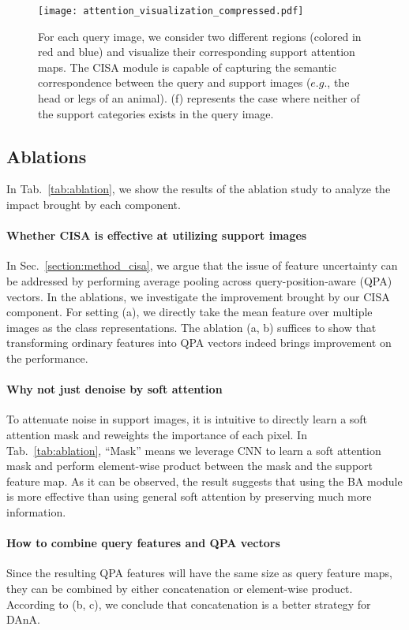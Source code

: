 \documentclass[journal]{IEEEtran}
\begin{document}
\begin{figure*}[h]
    \centering
    \texttt{[image: attention\_visualization\_compressed.pdf]}
    \caption{For each query image, we consider two different regions (colored in red and blue) and visualize their corresponding support attention maps. The CISA module is capable of capturing the semantic correspondence between the query and support images ($e.g.$, the head or legs of an animal). (f) represents the case where neither of the support categories exists in the query image.
    }
    \label{fig:attention_visualization}
\end{figure*} 


\subsection{Ablations}
In Tab.~\ref{tab:ablation}, we show the results of the ablation study to analyze the impact brought by each component.


\paragraph{Whether CISA is effective at utilizing support images}
In Sec.~\ref{section:method_cisa}, we argue that the issue of feature uncertainty can be addressed by performing average pooling across query-position-aware (QPA) vectors.
In the ablations, we investigate the improvement brought by our CISA component.
For setting (a), we directly take the mean feature over multiple images as the class representations.
The ablation (a, b) suffices to show that transforming ordinary features into QPA vectors indeed brings improvement on the performance.


\paragraph{Why not just denoise by soft attention}
To attenuate noise in support images, it is intuitive to directly learn a soft attention mask and reweights the importance of each pixel.
In Tab.~\ref{tab:ablation}, ``Mask'' means we leverage CNN to learn a soft attention mask and perform element-wise product between the mask and the support feature map.
As it can be observed, the result suggests that using the BA module is more effective than using general soft attention by preserving much more information.


\paragraph{How to combine query features and QPA vectors} 
Since the resulting QPA features will have the same size as query feature maps, they can be combined by either concatenation or element-wise product.
According to (b, c), we conclude that concatenation is a better strategy for DAnA.
\end{document}
